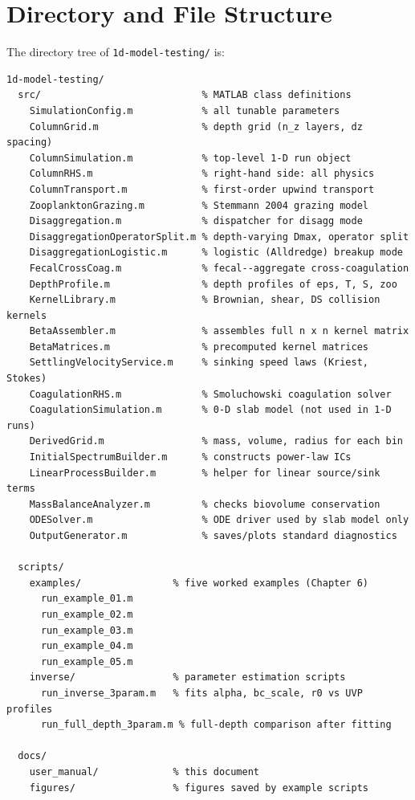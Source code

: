\documentclass[12pt,a4paper]{report}
\numberwithin{equation}{chapter}
\begin{document}
\chapter{Directory and File Structure}
\label{sec:structure}

The directory tree of \texttt{1d-model-testing/} is:

\begin{verbatim}
1d-model-testing/
  src/                            % MATLAB class definitions
    SimulationConfig.m            % all tunable parameters
    ColumnGrid.m                  % depth grid (n_z layers, dz spacing)
    ColumnSimulation.m            % top-level 1-D run object
    ColumnRHS.m                   % right-hand side: all physics
    ColumnTransport.m             % first-order upwind transport
    ZooplanktonGrazing.m          % Stemmann 2004 grazing model
    Disaggregation.m              % dispatcher for disagg mode
    DisaggregationOperatorSplit.m % depth-varying Dmax, operator split
    DisaggregationLogistic.m      % logistic (Alldredge) breakup mode
    FecalCrossCoag.m              % fecal--aggregate cross-coagulation
    DepthProfile.m                % depth profiles of eps, T, S, zoo
    KernelLibrary.m               % Brownian, shear, DS collision kernels
    BetaAssembler.m               % assembles full n x n kernel matrix
    BetaMatrices.m                % precomputed kernel matrices
    SettlingVelocityService.m     % sinking speed laws (Kriest, Stokes)
    CoagulationRHS.m              % Smoluchowski coagulation solver
    CoagulationSimulation.m       % 0-D slab model (not used in 1-D runs)
    DerivedGrid.m                 % mass, volume, radius for each bin
    InitialSpectrumBuilder.m      % constructs power-law ICs
    LinearProcessBuilder.m        % helper for linear source/sink terms
    MassBalanceAnalyzer.m         % checks biovolume conservation
    ODESolver.m                   % ODE driver used by slab model only
    OutputGenerator.m             % saves/plots standard diagnostics

  scripts/
    examples/                % five worked examples (Chapter 6)
      run_example_01.m
      run_example_02.m
      run_example_03.m
      run_example_04.m
      run_example_05.m
    inverse/                 % parameter estimation scripts
      run_inverse_3param.m   % fits alpha, bc_scale, r0 vs UVP profiles
      run_full_depth_3param.m % full-depth comparison after fitting

  docs/
    user_manual/             % this document
    figures/                 % figures saved by example scripts
\end{verbatim}
\end{document}
